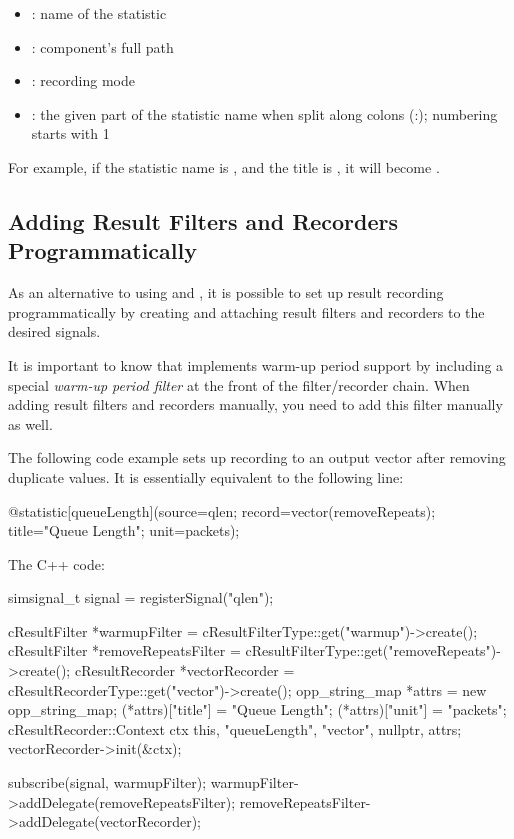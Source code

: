 \begin{itemize}
  \item {}: name of the statistic
  \item {}: component's full path
  \item {}: recording mode
  \item {}: the given part of the statistic name when split
    along colons (:); numbering starts with 1
\end{itemize}

For example, if the statistic name is ,
and the title is , it will become
.


\subsection{Adding Result Filters and Recorders Programmatically}
\label{sec:simple-modules:statistic-recording-programmatically}

As an alternative to using  and ,
it is possible to set up result recording programmatically by creating and
attaching result filters and recorders to the desired signals.

\begin{note}
It is important to know that  implements warm-up period
support by including a special \textit{warm-up period filter} at the
front of the filter/recorder chain. When adding result filters and recorders
manually, you need to add this filter manually as well.
\end{note}

The following code example sets up recording to an output vector after
removing duplicate values. It is essentially equivalent to the following
 line:

\begin{ned}
@statistic[queueLength](source=qlen; record=vector(removeRepeats);
                        title="Queue Length"; unit=packets);
\end{ned}

The C++ code:

\begin{cpp}
simsignal_t signal = registerSignal("qlen");

cResultFilter *warmupFilter =
        cResultFilterType::get("warmup")->create();
cResultFilter *removeRepeatsFilter =
        cResultFilterType::get("removeRepeats")->create();
cResultRecorder *vectorRecorder =
        cResultRecorderType::get("vector")->create();
opp_string_map *attrs = new opp_string_map;
(*attrs)["title"] = "Queue Length";
(*attrs)["unit"] = "packets";
cResultRecorder::Context ctx { this, "queueLength", "vector",
                               nullptr, attrs};
vectorRecorder->init(&ctx);

subscribe(signal, warmupFilter);
warmupFilter->addDelegate(removeRepeatsFilter);
removeRepeatsFilter->addDelegate(vectorRecorder);
\end{cpp}


